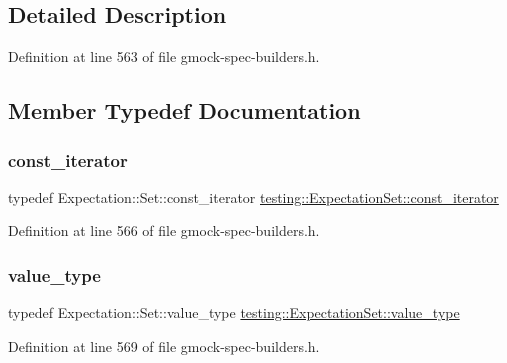 \subsection{Detailed Description}


Definition at line 563 of file gmock-\/spec-\/builders.\+h.



\subsection{Member Typedef Documentation}
\mbox{\label{classtesting_1_1ExpectationSet_ab269a45f80d8c4f747b29de454a084bb}} 
\subsubsection{\texorpdfstring{const\+\_\+iterator}{const\_iterator}}
{\footnotesize\ttfamily typedef Expectation\+::\+Set\+::const\+\_\+iterator \hyperlink{classtesting_1_1ExpectationSet_ab269a45f80d8c4f747b29de454a084bb}{testing\+::\+Expectation\+Set\+::const\+\_\+iterator}}



Definition at line 566 of file gmock-\/spec-\/builders.\+h.

\mbox{\label{classtesting_1_1ExpectationSet_aab6d2d4800cec231bcedae33deaca7f6}} 
\subsubsection{\texorpdfstring{value\+\_\+type}{value\_type}}
{\footnotesize\ttfamily typedef Expectation\+::\+Set\+::value\+\_\+type \hyperlink{classtesting_1_1ExpectationSet_aab6d2d4800cec231bcedae33deaca7f6}{testing\+::\+Expectation\+Set\+::value\+\_\+type}}



Definition at line 569 of file gmock-\/spec-\/builders.\+h.



